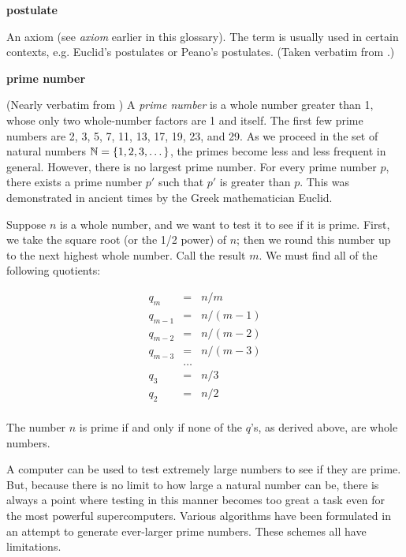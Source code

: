 \begin{vworktermglossaryenum}
\item \textbf{postulate}

      An axiom (see \emph{axiom} earlier in this glossary).  The term is usually
	  used in certain contexts, e.g. Euclid's postulates or Peano's postulates.
	  (Taken verbatim from \cite{bibref:b:penguindictionaryofmathematics:2ded}.)

\item \textbf{prime number}

      (Nearly verbatim from \cite{bibref:w:wwwwhatiscom}) A \emph{prime number}
      is a whole number greater than 1, whose only two whole-number 
      factors are 1 and itself.  The first few prime numbers are 
      2, 3, 5, 7, 11, 13, 17, 19, 23, and 29.  As we proceed in the set of 
      natural numbers ${\mathbb{N}}{} = \{ 1, 2, 3, \ldots{} \} $, the 
      primes become less and less frequent in general.  
      However, there is no largest prime number.  
      For every prime number $p$, there exists a prime number $p'$ such that 
      $p'$ is greater than $p$.  This was demonstrated in ancient times by the 
      Greek mathematician Euclid.%

      Suppose $n$ is a whole number, and we want to test it to see if it is prime.   
      First, we take the square root (or the 1/2 power) of $n$; then we round this 
      number up to the next highest whole number.  Call the result $m$.  
      We must find all of the following quotients:

      \begin{equation}
      \begin{array}{rcl}
         q_m     & =        & n / m              \\
         q_{m-1} & =        & n / (m-1)          \\
         q_{m-2} & =        & n / (m-2)          \\
         q_{m-3} & =        & n / (m-3)          \\
                 & \ldots{} &                    \\
         q_3     & =        & n / 3              \\
         q_2     & =        & n / 2              \\
      \end{array}
      \end{equation}

      The number $n$ is prime if and only if none of the $q$'s, as 
      derived above, are whole numbers.

      A computer can be used to test extremely large numbers to see if they are prime.  
      But, because there is no limit to how large a natural number can be, 
      there is always a point where testing in this manner becomes too great 
      a task even for the most powerful supercomputers.  
      Various algorithms have been formulated in an attempt to generate 
      ever-larger prime numbers.  These schemes all have limitations.

\end{vworktermglossaryenum}

